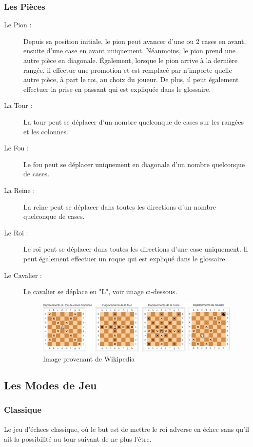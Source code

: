 \documentclass[10pt, a4paper]{article}
\begin{document}
			\subsubsection{Les Pièces}
			\begin{description}
		  \item[Le Pion :] Depuis sa position initiale, le pion peut avancer d'une ou 2 cases en avant, ensuite d'une case en avant uniquement. Néanmoins, le pion prend une autre pièce en diagonale. Également, lorsque le pion arrive à la dernière rangée, il effectue une promotion et est remplacé par n'importe quelle autre pièce, à part le roi, au choix du joueur. De plus, il peut également effectuer la prise en passant qui est expliquée dans le glossaire.
			\item[La Tour :] La tour peut se déplacer d'un nombre quelconque de cases sur les rangées et les colonnes.
			\item[Le Fou :] Le fou peut se déplacer uniquement en diagonale d'un nombre quelconque de cases.
			\item[La Reine :] La reine peut se déplacer dans toutes les directions d'un nombre quelconque de cases.
			\item[Le Roi :] Le roi peut se déplacer dans toutes les directions d'une case uniquement. Il peut également effectuer un roque qui est expliqué dans le glossaire.
			\item[Le Cavalier :] Le cavalier se déplace en "L", voir image ci-dessous.
			\begin{figure}[b]
			\includegraphics[scale=0.50]{pieces_move.png}
			\caption{Image provenant de Wikipedia}
			\end{figure}
			\end{description}
			\clearpage
			
			\subsection{Les Modes de Jeu}
				\subsubsection{Classique}
					\paragraph{}Le jeu d'échecs classique, où le but est de mettre le roi adverse en échec sans qu'il ait la possibilité au tour suivant de ne plus l'être.
\end{document}
